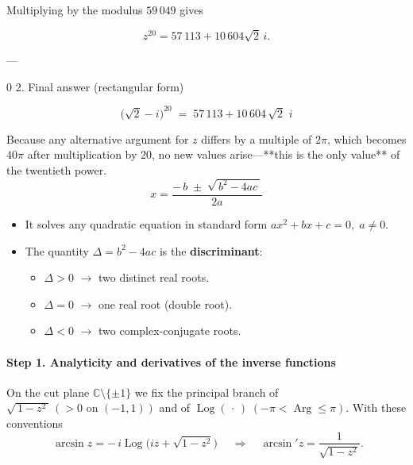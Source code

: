 \documentclass[12pt]{article}
\DeclareMathOperator{\Log}{Log}
\DeclareMathOperator{\Arg}{Arg}
\theoremstyle{definition} %
\theoremstyle{plain} %
\begin{document}
Multiplying by the modulus \(59\,049\) gives

\[
z^{20}
   = 57\,113 + 10\,604\sqrt2\,i.
\]

---

0 2.  Final answer (rectangular form)

\[
\boxed{\;
     \bigl(\sqrt{2}-i\bigr)^{20}
     \;=\;
     57\,113 + 10\,604\,\sqrt{2}\,\,i
     \;}
\]

Because any alternative argument for \(z\) differs by a multiple of
\(2\pi\), which becomes \(40\pi\) after multiplication by \(20\),
no new values arise—**this is the only value** of the twentieth power.
\pagebreak
\[
\boxed{\;
x=\frac{-\,b\;\pm\;\sqrt{\,b^{2}-4ac\,}}{2a}
\;}
\]

\begin{itemize}
  \item It solves any quadratic equation in standard form
        \(\displaystyle ax^{2}+bx+c=0,\;a\neq0\).
  \item The quantity \(\Delta=b^{2}-4ac\) is the \textbf{discriminant}:
        \begin{itemize}
          \item \(\Delta>0\) \(\rightarrow\) two distinct real roots.
          \item \(\Delta=0\) \(\rightarrow\) one real root (double root).
          \item \(\Delta<0\) \(\rightarrow\) two complex-conjugate roots.
        \end{itemize}
\end{itemize}
\pagebreak
\paragraph{Step 1.  Analyticity and derivatives of the inverse functions}

On the cut plane \(\mathbb{C}\setminus\{\pm1\}\) we fix the principal branch of
\(\sqrt{\,1-z^{2}\,}\,(>0\text{ on }(-1,1))\) and of
\(\Log(\,\cdot\,)\;( -\pi<\Arg\le\pi)\).
With these conventions
\[
\boxed{\;
\arcsin z
   =-\,i\Log\!\bigl( iz+\sqrt{1-z^{2}}\bigr)
\;}
\quad\Longrightarrow\quad
\arcsin' z
   =\frac{1}{\sqrt{1-z^{2}}}.
\]
\end{document}
